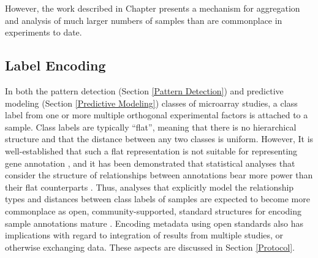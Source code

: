 However, the work described in Chapter \celsiuschapter presents a mechanism for
aggregation and analysis of much larger numbers of samples than are commonplace
in experiments to date.

\subsection{Label Encoding}\label{Label Encoding}

In both the pattern detection (Section \ref{Pattern Detection}) and predictive
modeling (Section \ref{Predictive Modeling}) classes of microarray studies, a
class label from one or more multiple orthogonal experimental factors is
attached to a sample.  Class labels are typically ``flat'', meaning that there
is no hierarchical structure and that the distance between any two classes is
uniform.  However, It is well-established that such a flat representation is
not suitable for representing gene annotation \cite{go}, and it has been
demonstrated that statistical analyses that consider the structure of
relationships between annotations bear more power than their flat counterparts
\cite{ease,gocluster,pachinko}.  Thus, analyses that explicitly model the
relationship types and distances between class labels of samples are expected
to become more commonplace as open, community-supported, standard structures
for encoding sample annotations mature \cite{so, obo, mpath, cl, mo, ma, mpath,
mp}.  Encoding metadata using open standards also has implications with regard
to integration of results from multiple studies, or otherwise exchanging data.
These aspects are discussed in Section \ref{Protocol}.
